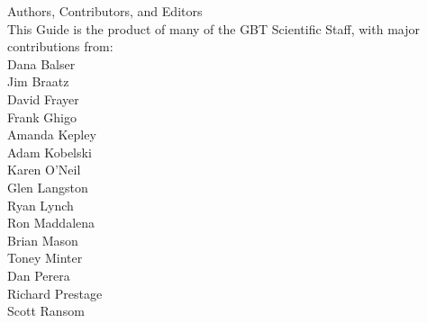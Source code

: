 \documentclass{book}
\begin{document}
\newpage
\setcounter{page}{0}
\newpage



\vspace*{2in}

\begin{center}
{{\bigskip \LARGE Authors, Contributors, and Editors\\ \bigskip} 
\large This Guide is the product of many of the GBT Scientific Staff, with major contributions from:\\
\bigskip
\large Dana Balser\\ \bigskip
\large Jim Braatz\\ \bigskip
\large David Frayer\\ \bigskip
\large Frank Ghigo\\ \bigskip
\large Amanda Kepley \\ \bigskip
\large Adam Kobelski\\ \bigskip
\large Karen O'Neil \\ \bigskip
\large Glen Langston \\ \bigskip 
\large Ryan Lynch \\ \bigskip
\large Ron Maddalena\\ \bigskip
\large Brian Mason\\ \bigskip 
\large Toney Minter\\ \bigskip
\large Dan Perera\\ \bigskip
\large Richard Prestage\\ \bigskip
\large Scott Ransom\\ \bigskip  } 
\end{center}

{}
\setcounter{page}{-12}
\pagestyle{plain}

\setcounter{secnumdepth}{4}
\setcounter{tocdepth}{4}
\tableofcontents

\listoffigures
\listoftables
\lstlistoflistings

\newpage
\mainmatter
{}
\pagestyle{headings}


\end{document}

